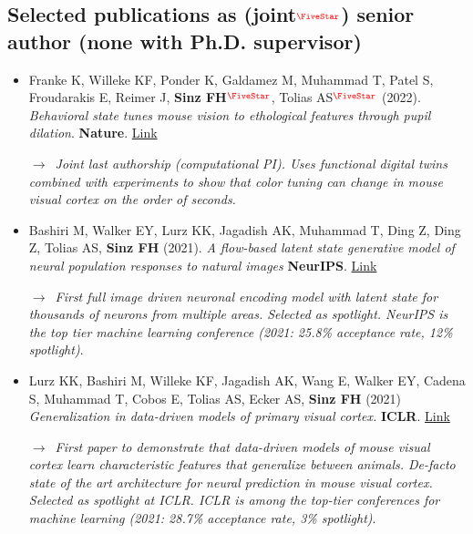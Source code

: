 \documentclass[COG,11pt]{ercgrant}
\begin{document}
\subsection{Selected publications as (joint$^{\color{red}\fstar}$) senior author (none with Ph.D. supervisor)}
\begin{itemize}[topsep=0pt,itemsep=0.62ex,partopsep=0ex,parsep=0.5ex]
    \item Franke K, Willeke KF, Ponder K, Galdamez M, Muhammad T, Patel S, Froudarakis E, Reimer J, \textbf{Sinz FH}$^{\color{red}\fstar}$, Tolias AS$^{\color{red}\fstar}$ (2022). \textit{Behavioral state tunes mouse vision to ethological features through pupil dilation}. \textbf{Nature}. \href{https://www.nature.com/articles/s41586-022-05270-3}{Link}
    
    $\rightarrow$~\textit{Joint last authorship (computational PI). Uses functional digital twins combined with experiments to show that color tuning can change in mouse visual cortex on the order of seconds. }
    
    \item Bashiri M, Walker EY, Lurz KK, Jagadish AK, Muhammad T, Ding Z, Ding Z, Tolias AS, \textbf{Sinz FH} (2021). \textit{A flow-based latent state generative model of neural population responses to natural images} \textbf{NeurIPS}. \href{https://openreview.net/forum?id=1yeYYtLqq7K}{Link}
    
    $\rightarrow$~\textit{First full image driven neuronal encoding model with latent state for thousands of neurons from multiple areas. Selected as spotlight. NeurIPS is the top tier machine learning conference (2021: 25.8\% acceptance rate, 12\% spotlight)}.
    
    \item Lurz KK, Bashiri M, Willeke KF, Jagadish AK, Wang E, Walker EY, Cadena S, Muhammad T, Cobos E, Tolias AS, Ecker AS, \textbf{Sinz FH} (2021) \textit{Generalization in data-driven models of primary visual cortex.} \textbf{ICLR}. \href{https://openreview.net/forum?id=Tp7kI90Htd}{Link}
    
    $\rightarrow$~\textit{First paper to demonstrate that data-driven models of mouse visual cortex learn characteristic features that generalize between animals. De-facto state of the art architecture for neural prediction in mouse visual cortex. Selected as spotlight at ICLR. ICLR is among the top-tier conferences for machine learning (2021: 28.7\% acceptance rate, 3\% spotlight)}.
\end{itemize}
\end{document}
